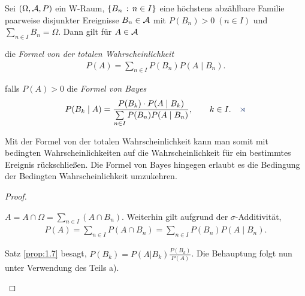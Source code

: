 \begin{prop}
\label{prop:1.8}
Sei $(\Omega, \AA, P)$ ein W-Raum, $\setdef{B_{n}}{n \in I}$ eine höchstens
abzählbare Familie paarweise disjunkter Ereignisse $B_{n} \in \AA$ mit
$P(B_{n}) > 0 \; (n \in I)$ und $\sum\limits_{n \in I} B_{n} = \Omega $. Dann
gilt für $A\in\AA$
\begin{propenum}
\item die \emph{Formel von der totalen Wahrscheinlichkeit}
\begin{align*}
P(A) = \sum\limits_{n \in I} P(B_{n})P(A\mid B_{n}).
\end{align*}
\item falls $P(A)>0$ die \emph{Formel von Bayes}
\begin{align*}
P(B_{k}\mid A)= {\displaystyle\frac{P(B_{k})\cdot P(A\mid B_{k})}
  {\sum\limits_{n\in I} P(B_{n})P(A\mid B_{n})}},\qquad k \in I.\fishhere
\end{align*}
\end{propenum}
\end{prop}
Mit der Formel von der totalen Wahrscheinlichkeit kann man somit mit bedingten
Wahrscheinlichkeiten auf die Wahrscheinlichkeit für ein bestimmtes
Ereignis rückschließen. Die Formel von Bayes hingegen erlaubt es die Bedingung
der Bedingten Wahrscheinlichkeit umzukehren.

\begin{proof}
\begin{proofenum}
  \item $A=A\cap \Omega = \sum\limits_{n\in I} (A\cap B_n)$. Weiterhin gilt
  aufgrund der $\sigma$-Additivität,
\begin{align*}
P(A) = \sum\limits_{n\in I} P(A\cap B_n) = \sum\limits_{n\in I}
P(B_n)P(A\mid B_n).
\end{align*}
\item Satz \ref{prop:1.7} besagt, $P(B_k) = P(A|B_k)\frac{P(B_k)}{P(A)}$. Die
Behauptung folgt nun unter Verwendung des Teils a).\qedhere
\end{proofenum}
\end{proof}

